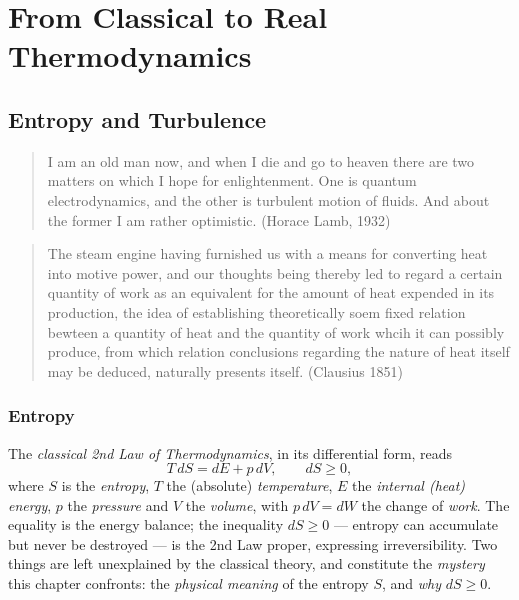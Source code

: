\part{From Classical to Real Thermodynamics}



\chapter{Entropy and Turbulence}\label{ch:entropy_turbulence}

\small
\begin{quote} I am an old man now, and when I die and go to heaven there are two matters on which I hope
for enlightenment. One is quantum electrodynamics, and the other is turbulent motion of fluids. And about the former I am 
rather optimistic. (Horace Lamb, 1932)
\end{quote}
\begin{quote} The steam engine having furnished us with a means for converting heat into motive power, and our thoughts being thereby led to regard a certain quantity of work as an equivalent for the amount of heat expended in its production, the idea of establishing theoretically soem fixed relation bewteen a quantity of heat and the quantity of work whcih it can possibly produce,
from which relation conclusions regarding the nature of heat itself may be deduced, naturally presents itself. (Clausius 1851)
\end{quote} 
\normalsize

\section{Entropy}

The \emph{classical 2nd Law of Thermodynamics}, in its differential form, reads
\begin{equation}\label{eq:classical2nd}
T\,dS = dE + p\,dV, \qquad dS \ge 0,
\end{equation}
where $S$ is the \emph{entropy}, $T$ the (absolute) \emph{temperature}, $E$ the
\emph{internal (heat) energy}, $p$ the \emph{pressure} and $V$ the \emph{volume},
with $p\,dV = dW$ the change of \emph{work}. The equality is the energy balance;
the inequality $dS \ge 0$ --- entropy can accumulate but never be destroyed --- is
the 2nd Law proper, expressing irreversibility. Two things are left unexplained
by the classical theory, and constitute the \emph{mystery} this chapter
confronts: the \emph{physical meaning} of the entropy $S$, and \emph{why}
$dS \ge 0$.


